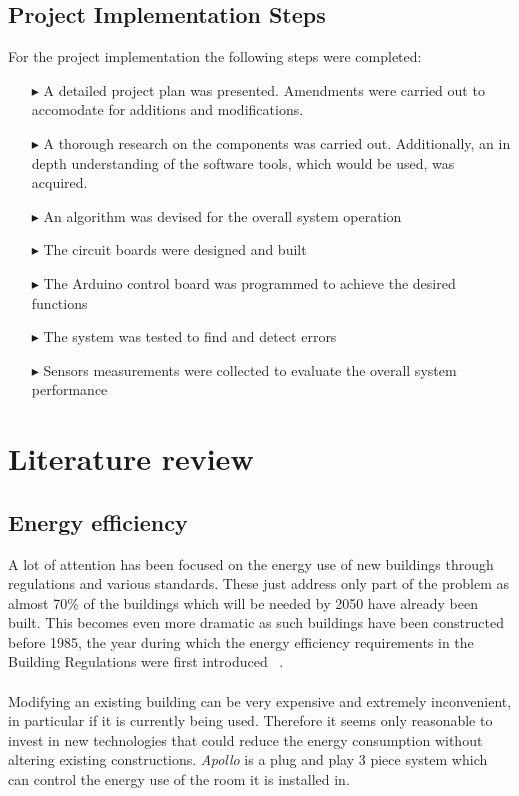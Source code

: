 \documentclass[12pt,a4paper,draft]{report}
\begin{document}
\section{Project Implementation Steps}
For the project implementation the following steps were completed:
\begin{itemize}
	\item[$\blacktriangleright$] A detailed project plan was presented. 
		Amendments were carried out to accomodate for additions and modifications.
	\item[$\blacktriangleright$] A thorough research on the components was carried out. 
		Additionally, an in depth understanding of the software tools, which would be used, was acquired.
	\item[$\blacktriangleright$] An algorithm was devised for the overall system operation
	\item[$\blacktriangleright$] The circuit boards were designed and built
	\item[$\blacktriangleright$] The Arduino control board was programmed to achieve the desired functions
	\item[$\blacktriangleright$] The system was tested to find and detect errors
	\item[$\blacktriangleright$] Sensors measurements were collected to evaluate the overall system performance
\end{itemize}
%
\newpage
\chapter{Literature review}
%
\section{Energy efficiency}
A lot of attention has been focused on the energy use of new buildings through regulations and various standards. These just address only part of the problem as almost 70\% of the buildings which will be needed by 2050 have already been built. This becomes even more dramatic as such buildings have been constructed before 1985, the year during which the energy efficiency requirements in the Building Regulations were first introduced ~\cite{website:building_reg,website:carbon_trust}.
\ \\
\ \\
Modifying an existing building can be very expensive and extremely inconvenient, in particular if it is currently being used. Therefore it seems only reasonable to invest in new technologies that could reduce the energy consumption without altering existing constructions. \emph{Apollo} is a plug and play 3 piece system which can control the energy use of the room it is installed in.\\
\ \\
%
\end{document}
